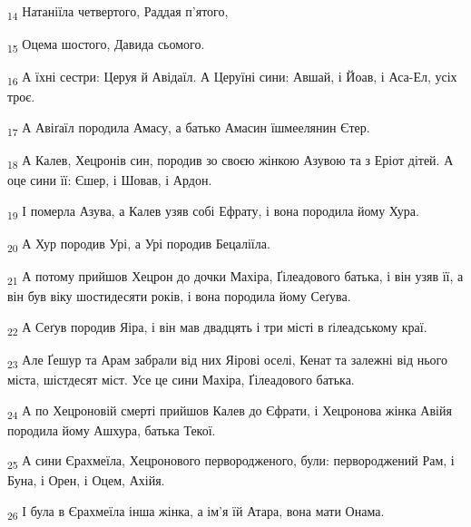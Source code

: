 \begin{tcolorbox}
\textsubscript{14} Натаніїла четвертого, Раддая п'ятого,
\end{tcolorbox}
\begin{tcolorbox}
\textsubscript{15} Оцема шостого, Давида сьомого.
\end{tcolorbox}
\begin{tcolorbox}
\textsubscript{16} А їхні сестри: Церуя й Авідаїл. А Церуїні сини: Авшай, і Йоав, і Аса-Ел, усіх троє.
\end{tcolorbox}
\begin{tcolorbox}
\textsubscript{17} А Авіґаїл породила Амасу, а батько Амасин їшмеелянин Єтер.
\end{tcolorbox}
\begin{tcolorbox}
\textsubscript{18} А Калев, Хецронів син, породив зо своєю жінкою Азувою та з Еріот дітей. А оце сини її: Єшер, і Шовав, і Ардон.
\end{tcolorbox}
\begin{tcolorbox}
\textsubscript{19} І померла Азува, а Калев узяв собі Ефрату, і вона породила йому Хура.
\end{tcolorbox}
\begin{tcolorbox}
\textsubscript{20} А Хур породив Урі, а Урі породив Бецаліїла.
\end{tcolorbox}
\begin{tcolorbox}
\textsubscript{21} А потому прийшов Хецрон до дочки Махіра, Ґілеадового батька, і він узяв її, а він був віку шостидесяти років, і вона породила йому Сеґува.
\end{tcolorbox}
\begin{tcolorbox}
\textsubscript{22} А Сеґув породив Яіра, і він мав двадцять і три місті в ґілеадському краї.
\end{tcolorbox}
\begin{tcolorbox}
\textsubscript{23} Але Ґешур та Арам забрали від них Яірові оселі, Кенат та залежні від нього міста, шістдесят міст. Усе це сини Махіра, Ґілеадового батька.
\end{tcolorbox}
\begin{tcolorbox}
\textsubscript{24} А по Хецроновій смерті прийшов Калев до Єфрати, і Хецронова жінка Авійя породила йому Ашхура, батька Текої.
\end{tcolorbox}
\begin{tcolorbox}
\textsubscript{25} А сини Єрахмеїла, Хецронового первородженого, були: первороджений Рам, і Буна, і Орен, і Оцем, Ахійя.
\end{tcolorbox}
\begin{tcolorbox}
\textsubscript{26} І була в Єрахмеїла інша жінка, а ім'я їй Атара, вона мати Онама.
\end{tcolorbox}
